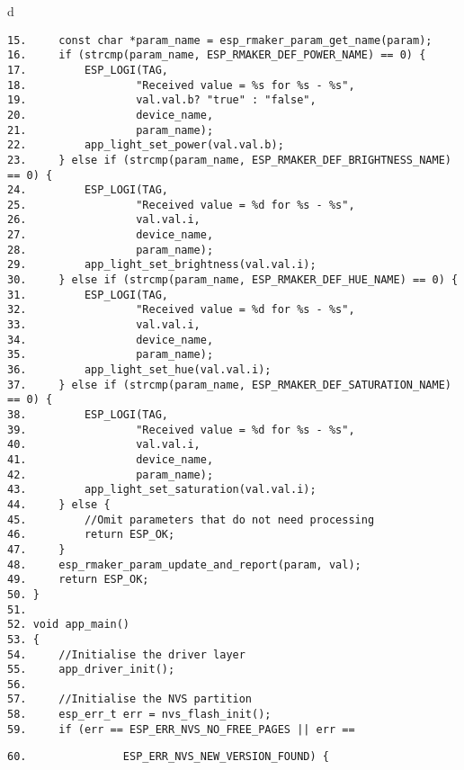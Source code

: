 \documentclass[a4paper,12pt]{book}
\begin{document}
\begin{codebloc}
\begin{tabular}{d}
\vspace{2pt}
\begin{verbatim}
15.     const char *param_name = esp_rmaker_param_get_name(param);
16.     if (strcmp(param_name, ESP_RMAKER_DEF_POWER_NAME) == 0) {
17.         ESP_LOGI(TAG,
18.                 "Received value = %s for %s - %s",
19.                 val.val.b? "true" : "false",
20.                 device_name,
21.                 param_name);
22.         app_light_set_power(val.val.b);
23.     } else if (strcmp(param_name, ESP_RMAKER_DEF_BRIGHTNESS_NAME) == 0) {
24.         ESP_LOGI(TAG,
25.                 "Received value = %d for %s - %s",
26.                 val.val.i,
27.                 device_name,
28.                 param_name);
29.         app_light_set_brightness(val.val.i);
30.     } else if (strcmp(param_name, ESP_RMAKER_DEF_HUE_NAME) == 0) {
31.         ESP_LOGI(TAG,
32.                 "Received value = %d for %s - %s",
33.                 val.val.i, 
34.                 device_name, 
35.                 param_name);
36.         app_light_set_hue(val.val.i);
37.     } else if (strcmp(param_name, ESP_RMAKER_DEF_SATURATION_NAME) == 0) {
38.         ESP_LOGI(TAG, 
39.                 "Received value = %d for %s - %s",
40.                 val.val.i, 
41.                 device_name, 
42.                 param_name);
43.         app_light_set_saturation(val.val.i);
44.     } else {
45.         //Omit parameters that do not need processing
46.         return ESP_OK;
47.     }
48.     esp_rmaker_param_update_and_report(param, val);
49.     return ESP_OK;
50. }
51.	
52. void app_main()
53. {
54.     //Initialise the driver layer
55.     app_driver_init();
56.	
57.     //Initialise the NVS partition
58.     esp_err_t err = nvs_flash_init();
59.     if (err == ESP_ERR_NVS_NO_FREE_PAGES || err ==
\end{verbatim}
\verb|60.               ESP_ERR_NVS_NEW_VERSION_FOUND) {|
\end{tabular}
\end{codebloc}
\end{document}

